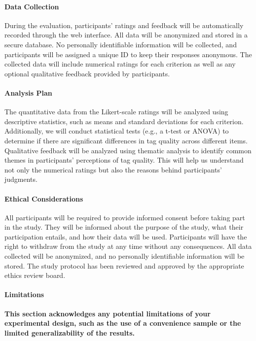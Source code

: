 \paragraph{Data Collection}
During the evaluation, participants' ratings and feedback will be automatically recorded through the web interface. All data will be anonymized and stored in a secure database. No personally identifiable information will be collected, and participants will be assigned a unique ID to keep their responses anonymous. The collected data will include numerical ratings for each criterion as well as any optional qualitative feedback provided by participants.

\paragraph{Analysis Plan}
The quantitative data from the Likert-scale ratings will be analyzed using descriptive statistics, such as means and standard deviations for each criterion. Additionally, we will conduct statistical tests (e.g., a t-test or ANOVA) to determine if there are significant differences in tag quality across different items. Qualitative feedback will be analyzed using thematic analysis to identify common themes in participants' perceptions of tag quality. This will help us understand not only the numerical ratings but also the reasons behind participants' judgments.

\paragraph{Ethical Considerations}
All participants will be required to provide informed consent before taking part in the study. They will be informed about the purpose of the study, what their participation entails, and how their data will be used. Participants will have the right to withdraw from the study at any time without any consequences. All data collected will be anonymized, and no personally identifiable information will be stored. The study protocol has been reviewed and approved by the appropriate ethics review board.

\paragraph{Limitations}
\textbf{This section acknowledges any potential limitations of your experimental design, such as the use of a convenience sample or the limited generalizability of the results.}

